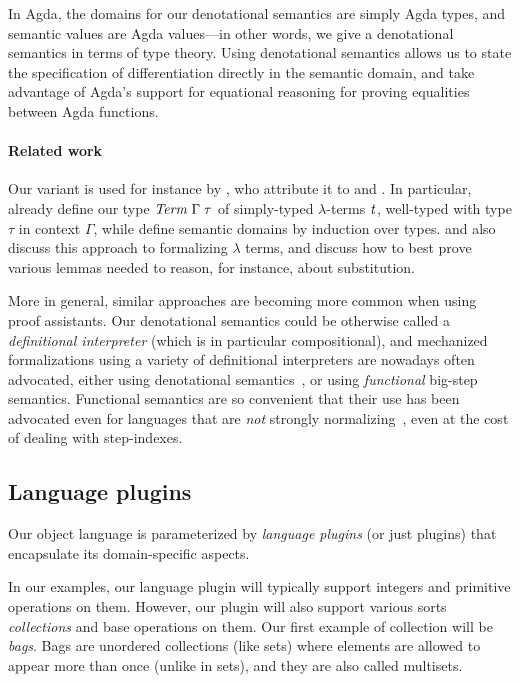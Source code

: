 In Agda, the domains for our denotational semantics are simply
Agda types, and semantic values are Agda values---in other words,
we give a denotational semantics in terms of type
theory.
Using denotational semantics allows us to state the specification
of differentiation directly in the semantic domain, and take
advantage of Agda's support for equational reasoning for proving
equalities between Agda functions.

\paragraph{Related work}
Our variant is used for instance by
\citet{McBride2010outrageous}, who attribute it to
\citet{Augustsson1999exercise} and \citet{Altenkirch1999monadic}.
In particular, \citet{Altenkirch1999monadic} already define our
type \ensuremath{\Conid{Term}\;\Gamma\;\tau} of simply-typed $\lambda$-terms \ensuremath{\Varid{t}},
well-typed with type \ensuremath{\tau} in context \ensuremath{\Gamma}, while
\citet{Augustsson1999exercise} define semantic domains by
induction over types.
\citet{Benton2012strongly} and \citet{Allais2017typeandscope}
also discuss this approach to formalizing $\lambda$ terms, and
discuss how to best prove various lemmas needed to reason, for
instance, about substitution.

More in general, similar approaches are becoming more common when
using proof assistants. Our denotational semantics could be
otherwise called a \emph{definitional interpreter} (which is in
particular compositional), and mechanized formalizations using a
variety of definitional interpreters are nowadays often
advocated, either using denotational
semantics~\citep{Chlipala08}, or using \emph{functional} big-step
semantics. Functional semantics are so convenient that their use
has been advocated even for languages that are \emph{not}
strongly normalizing~\citep{Owens2016functional,Amin2017Type}, even
at the cost of dealing with step-indexes.

\subsection{Language plugins}
\label{sec:lang-plugins}
Our object language is parameterized by \emph{language plugins} (or just
plugins) that encapsulate its domain-specific aspects.

In our examples, our language plugin will typically support
integers and primitive operations on them. However, our plugin
will also support various sorts \emph{collections} and base
operations on them. Our first example of collection will be
\emph{bags}. Bags are unordered collections (like sets) where
elements are allowed to appear more than once (unlike in sets), and
they are also called multisets.

